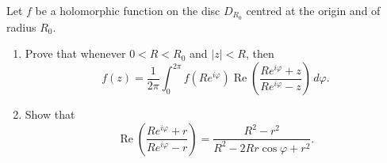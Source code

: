 \documentclass[12 pt, letterpaper]{hmcpset}
\begin{document}
\begin{problem}[11.]
	Let $f$ be a holomorphic function on the disc $D_{R_{0}}$ centred at the origin and of radius $R_{0}$.
	\begin{enumerate}
		\item Prove that whenever $0 < R < R_{0}$ and $\lvert z \rvert < R$, then
			\[
				f(z) = \frac{1}{2 \pi} \int_{0}^{2 \pi} f(R e^{i \varphi}) \operatorname{Re} \left ( \frac{R e^{i \varphi} + z}{R e^{i \varphi} - z} \right ) \, d\varphi.
			\]
		\item Show that
			\[
				\operatorname{Re} \left ( \frac{R e^{i \varphi} + r}{R e^{i \varphi} - r} \right ) = \frac{R^{2} - r^{2}}{R^{2} - 2 R r \cos{\varphi} + r^{2}}.
			\]
	\end{enumerate}
\end{problem}
\end{document}
